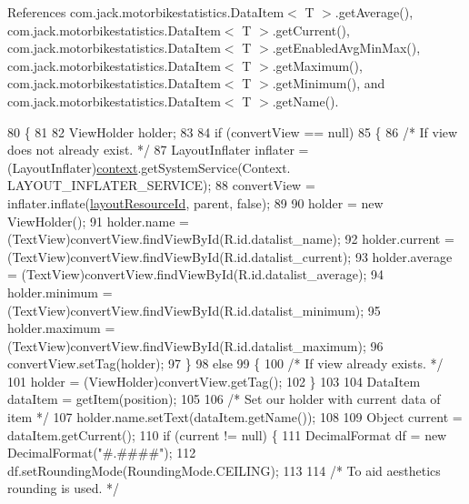 References com.\+jack.\+motorbikestatistics.\+Data\+Item$<$ T $>$.\+get\+Average(), com.\+jack.\+motorbikestatistics.\+Data\+Item$<$ T $>$.\+get\+Current(), com.\+jack.\+motorbikestatistics.\+Data\+Item$<$ T $>$.\+get\+Enabled\+Avg\+Min\+Max(), com.\+jack.\+motorbikestatistics.\+Data\+Item$<$ T $>$.\+get\+Maximum(), com.\+jack.\+motorbikestatistics.\+Data\+Item$<$ T $>$.\+get\+Minimum(), and com.\+jack.\+motorbikestatistics.\+Data\+Item$<$ T $>$.\+get\+Name().


\begin{DoxyCode}
80                                                                           \{
81 
82         ViewHolder holder;
83 
84         \textcolor{keywordflow}{if} (convertView == null)
85         \{
86             \textcolor{comment}{/* If view does not already exist. */}
87             LayoutInflater inflater = (LayoutInflater)\hyperlink{classcom_1_1jack_1_1motorbikestatistics_1_1_data_list_adapter_a2d3041a39701b01f4075cdc8c0bf4463}{context}.getSystemService(Context.
      LAYOUT\_INFLATER\_SERVICE);
88             convertView = inflater.inflate(\hyperlink{classcom_1_1jack_1_1motorbikestatistics_1_1_data_list_adapter_a03f68396c0f1b8b03feed8d6e3cf115d}{layoutResourceId}, parent, \textcolor{keyword}{false});
89 
90             holder = \textcolor{keyword}{new} ViewHolder();
91             holder.name = (TextView)convertView.findViewById(R.id.datalist\_name);
92             holder.current = (TextView)convertView.findViewById(R.id.datalist\_current);
93             holder.average = (TextView)convertView.findViewById(R.id.datalist\_average);
94             holder.minimum = (TextView)convertView.findViewById(R.id.datalist\_minimum);
95             holder.maximum = (TextView)convertView.findViewById(R.id.datalist\_maximum);
96             convertView.setTag(holder);
97         \}
98         \textcolor{keywordflow}{else}
99         \{
100             \textcolor{comment}{/* If view already exists. */}
101             holder = (ViewHolder)convertView.getTag();
102         \}
103 
104         DataItem dataItem = getItem(position);
105 
106         \textcolor{comment}{/* Set our holder with current data of item */}
107         holder.name.setText(dataItem.getName());
108 
109         Object current = dataItem.getCurrent();
110         \textcolor{keywordflow}{if} (current != null) \{
111             DecimalFormat df = \textcolor{keyword}{new} DecimalFormat(\textcolor{stringliteral}{"#.####"});
112             df.setRoundingMode(RoundingMode.CEILING);
113 
114             \textcolor{comment}{/* To aid aesthetics rounding is used. */}

\end{DoxyCode}
